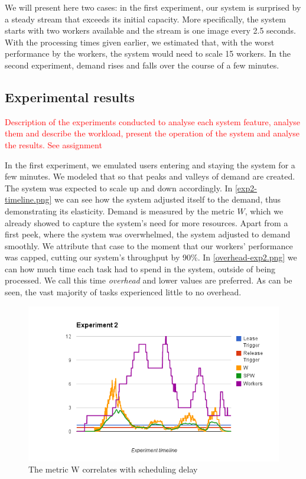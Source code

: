 \documentclass{stylesheet}
\begin{document}
We will present here two cases: in the first experiment, our system is surprised by a steady stream that exceeds its initial capacity. More specifically, the system starts with two workers available and the stream is one image every 2.5 seconds. With the processing times given earlier, we estimated that, with the worst performance by the workers, the system would need to scale 15 workers. In the second experiment, demand rises and falls over the course of a few minutes.

\subsection{Experimental results}
\label{subsec:results}
\textcolor{red}{Description of the experiments conducted to analyse each system feature, analyse them and describe the workload, present the operation of the system and analyse the results. See assignment}

In the first experiment, we emulated users entering and staying the system for a few minutes. We modeled that so that peaks and valleys of demand are created. The system was expected to scale up and down accordingly. In \cref{exp2-timeline.png} we can see how the system adjusted itself to the demand, thus demonstrating its elasticity. Demand is measured by the metric $W$, which we already showed to capture the system's need for more resources. Apart from a first peek, where the system was overwhelmed, the system adjusted to demand smoothly. We attribute that case to the moment that our workers' performance was capped, cutting our system's throughput by 90\%. In \cref{overhead-exp2.png} we can how much time each task had to spend in the system, outside of being processed. We call this time \textit{overhead} and lower values are preferred. As can be seen, the vast majority of tasks experienced little to no overhead.

\begin{figure}[b!]
	\centering
	\includegraphics[width=\linewidth]{exp2-timeline.png}
	\caption{The metric W correlates with scheduling delay}
	\label{fig:scheduling-W}
\end{figure}
\end{document}
